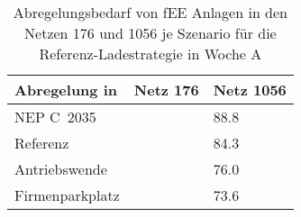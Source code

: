 {
\renewcommand{\arraystretch}{1.2}%
\begin{table}[H]
	\begin{center}
		\caption{Abregelungsbedarf von fEE Anlagen in den Netzen \num{176} und \num{1056} je Szenario für die Referenz-Ladestrategie in Woche A}
		\begin{tabu} to 0.6\textwidth {X[1.5] X[1, r] X[1, r]}
			\toprule
			Abregelung in   \si{\mwh} & Netz \num{176} & Netz \num{1056} \\ \midrule
			NEP C~\num{2035}              &                & \num{88.8}      \\
			Referenz                      &                & \num{84.3}      \\
			Antriebswende                 &                & \num{76.0}      \\
			\glqq Firmenparkplatz\grqq{}  &                & \num{73.6}      \\ \bottomrule
		\end{tabu}
		\label{tab:pv_dominated_week_a_fee_cur}
	\end{center}
	\vspace{-3mm}%
\end{table}
}